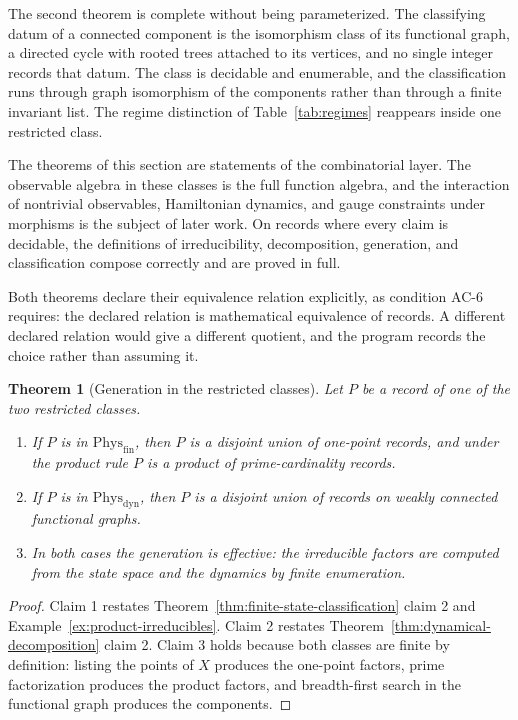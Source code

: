 \documentclass[11pt,letterpaper]{article}
\newtheorem{theorem}{Theorem}[section]
\theoremstyle{definition}
\theoremstyle{remark}
\begin{document}
The second theorem is complete without being parameterized. The classifying datum of a connected component is the isomorphism class of its functional graph, a directed cycle with rooted trees attached to its vertices, and no single integer records that datum. The class is decidable and enumerable, and the classification runs through graph isomorphism of the components rather than through a finite invariant list. The regime distinction of Table~\ref{tab:regimes} reappears inside one restricted class.

The theorems of this section are statements of the combinatorial layer. The observable algebra in these classes is the full function algebra, and the interaction of nontrivial observables, Hamiltonian dynamics, and gauge constraints under morphisms is the subject of later work. On records where every claim is decidable, the definitions of irreducibility, decomposition, generation, and classification compose correctly and are proved in full.

Both theorems declare their equivalence relation explicitly, as condition AC-6 requires: the declared relation is mathematical equivalence of records. A different declared relation would give a different quotient, and the program records the choice rather than assuming it.

\begin{theorem}[Generation in the restricted classes]
\label{thm:generation}
Let $P$ be a record of one of the two restricted classes.
\begin{enumerate}
\item If $P$ is in $\mathrm{Phys}_{\mathrm{fin}}$, then $P$ is a disjoint union of one-point records, and under the product rule $P$ is a product of prime-cardinality records.
\item If $P$ is in $\mathrm{Phys}_{\mathrm{dyn}}$, then $P$ is a disjoint union of records on weakly connected functional graphs.
\item In both cases the generation is effective: the irreducible factors are computed from the state space and the dynamics by finite enumeration.
\end{enumerate}
\end{theorem}

\begin{proof}
Claim 1 restates Theorem~\ref{thm:finite-state-classification} claim 2 and Example~\ref{ex:product-irreducibles}. Claim 2 restates Theorem~\ref{thm:dynamical-decomposition} claim 2. Claim 3 holds because both classes are finite by definition: listing the points of $X$ produces the one-point factors, prime factorization produces the product factors, and breadth-first search in the functional graph produces the components.
\end{proof}
\end{document}
